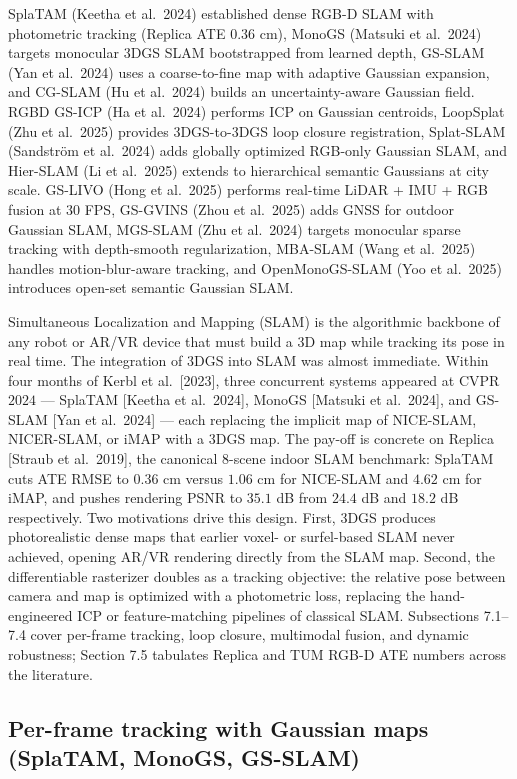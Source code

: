 SplaTAM (Keetha et al.~2024) established dense RGB-D SLAM with photometric tracking (Replica ATE \(0.36\) cm), MonoGS (Matsuki et al.~2024) targets monocular 3DGS SLAM bootstrapped from learned depth, GS-SLAM (Yan et al.~2024) uses a coarse-to-fine map with adaptive Gaussian expansion, and CG-SLAM (Hu et al.~2024) builds an uncertainty-aware Gaussian field. RGBD GS-ICP (Ha et al.~2024) performs ICP on Gaussian centroids, LoopSplat (Zhu et al.~2025) provides 3DGS-to-3DGS loop closure registration, Splat-SLAM (Sandström et al.~2024) adds globally optimized RGB-only Gaussian SLAM, and Hier-SLAM (Li et al.~2025) extends to hierarchical semantic Gaussians at city scale. GS-LIVO (Hong et al.~2025) performs real-time LiDAR + IMU + RGB fusion at \(30\) FPS, GS-GVINS (Zhou et al.~2025) adds GNSS for outdoor Gaussian SLAM, MGS-SLAM (Zhu et al.~2024) targets monocular sparse tracking with depth-smooth regularization, MBA-SLAM (Wang et al.~2025) handles motion-blur-aware tracking, and OpenMonoGS-SLAM (Yoo et al.~2025) introduces open-set semantic Gaussian SLAM.

Simultaneous Localization and Mapping (SLAM) is the algorithmic backbone of any robot or AR/VR device that must build a 3D map while tracking its pose in real time. The integration of 3DGS into SLAM was almost immediate. Within four months of Kerbl et al.~{[}2023{]}, three concurrent systems appeared at CVPR \(2024\) --- SplaTAM {[}Keetha et al.~2024{]}, MonoGS {[}Matsuki et al.~2024{]}, and GS-SLAM {[}Yan et al.~2024{]} --- each replacing the implicit map of NICE-SLAM, NICER-SLAM, or iMAP with a 3DGS map. The pay-off is concrete on Replica {[}Straub et al.~2019{]}, the canonical 8-scene indoor SLAM benchmark: SplaTAM cuts ATE RMSE to \(0.36\) cm versus \(1.06\) cm for NICE-SLAM and \(4.62\) cm for iMAP, and pushes rendering PSNR to \(35.1\) dB from \(24.4\) dB and \(18.2\) dB respectively. Two motivations drive this design. First, 3DGS produces photorealistic dense maps that earlier voxel- or surfel-based SLAM never achieved, opening AR/VR rendering directly from the SLAM map. Second, the differentiable rasterizer doubles as a tracking objective: the relative pose between camera and map is optimized with a photometric loss, replacing the hand-engineered ICP or feature-matching pipelines of classical SLAM. Subsections 7.1--7.4 cover per-frame tracking, loop closure, multimodal fusion, and dynamic robustness; Section 7.5 tabulates Replica and TUM RGB-D ATE numbers across the literature.

\subsection{Per-frame tracking with Gaussian maps (SplaTAM, MonoGS, GS-SLAM)}\label{per-frame-tracking-with-gaussian-maps-splatam-monogs-gs-slam}


